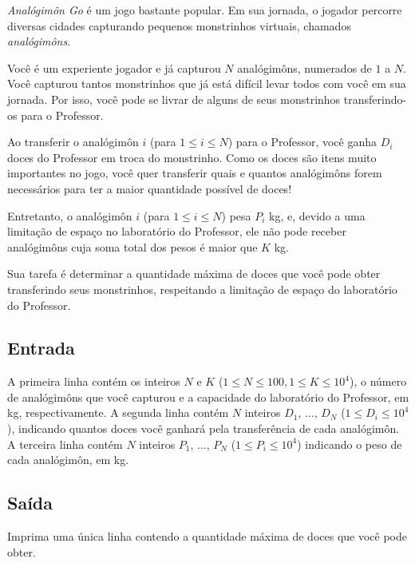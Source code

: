 \textit{Analógimôn Go} é um jogo bastante popular. Em sua jornada, o jogador percorre diversas
cidades capturando pequenos monstrinhos virtuais, chamados \textit{analógimôns}.

Você é um experiente jogador e já capturou $N$ analógimôns, numerados de $1$ a
$N$. Você capturou tantos monstrinhos que já está difícil levar todos com você
em sua jornada. Por isso, você pode se livrar de alguns de seus
monstrinhos transferindo-os para o Professor.

Ao transferir o analógimôn $i$ (para $1 \leq i \leq N$) para o Professor, você ganha
$D_i$ doces do Professor em troca do monstrinho. Como os doces são itens muito
importantes no jogo, você
quer transferir quais e quantos analógimôns forem necessários para ter a maior
quantidade possível de doces!

Entretanto, o analógimôn $i$ (para $1 \leq i \leq N$) pesa $P_i$ kg, e, devido a uma limitação de
espaço no laboratório do Professor, ele não pode receber analógimôns cuja soma
total dos pesos é maior que $K$ kg.

Sua tarefa é determinar a quantidade máxima de doces que você pode obter
transferindo seus monstrinhos, respeitando a limitação de espaço do laboratório do Professor.


\subsection*{Entrada}

A primeira linha contém os inteiros $N$ e $K$
($1 \leq N \leq 100, 1 \leq K \leq 10^4$), o número de analógimôns que você
capturou e a
capacidade do laboratório do Professor, em kg, respectivamente.
A segunda linha contém $N$ inteiros $D_1$, ..., $D_N$ ($1 \leq D_i \leq 10^4$), indicando quantos doces
você ganhará pela transferência de cada analógimôn. A terceira linha contém $N$
inteiros $P_1$, ..., $P_N$ ($1 \leq P_i \leq 10^4$) indicando o peso de cada analógimôn, em kg.

\subsection*{Saída}

Imprima uma única linha contendo a quantidade máxima de doces que você pode
obter.

